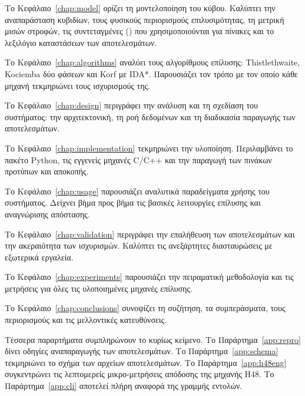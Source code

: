 Το Κεφάλαιο~\ref{chap:model} ορίζει τη μοντελοποίηση του κύβου. Καλύπτει την αναπαράσταση κυβιδίων, τους φυσικούς περιορισμούς επιλυσιμότητας, τη μετρική μισών στροφών, τις συντεταγμένες () που χρησιμοποιούνται για πίνακες και το λεξιλόγιο καταστάσεων των αποτελεσμάτων.

Το Κεφάλαιο~\ref{chap:algorithms} αναλύει τους αλγορίθμους επίλυσης: Thistlethwaite, Kociemba δύο φάσεων και Korf με IDA*. Παρουσιάζει τον τρόπο με τον οποίο κάθε μηχανή τεκμηριώνει τους ισχυρισμούς της.

Το Κεφάλαιο~\ref{chap:design} περιγράφει την ανάλυση και τη σχεδίαση του συστήματος: την αρχιτεκτονική, τη ροή δεδομένων και τη διαδικασία παραγωγής των αποτελεσμάτων.

Το Κεφάλαιο~\ref{chap:implementation} τεκμηριώνει την υλοποίηση. Περιλαμβάνει το πακέτο Python, τις εγγενείς μηχανές C/C++ και την παραγωγή των πινάκων προτύπων και αποκοπής.

Το Κεφάλαιο~\ref{chap:usage} παρουσιάζει αναλυτικά παραδείγματα χρήσης του συστήματος. Δείχνει βήμα προς βήμα τις βασικές λειτουργίες επίλυσης και αναγνώρισης απόστασης.

Το Κεφάλαιο~\ref{chap:validation} περιγράφει την επαλήθευση των αποτελεσμάτων και την ακεραιότητα των ισχυρισμών. Καλύπτει τις ανεξάρτητες διασταυρώσεις με εξωτερικά εργαλεία.

Το Κεφάλαιο~\ref{chap:experiments} παρουσιάζει την πειραματική μεθοδολογία και τις μετρήσεις για όλες τις υλοποιημένες μηχανές επίλυσης.

Το Κεφάλαιο~\ref{chap:conclusions} συνοψίζει τη συζήτηση, τα συμπεράσματα, τους περιορισμούς και τις μελλοντικές κατευθύνσεις.

Τέσσερα παραρτήματα συμπληρώνουν το κυρίως κείμενο. Το Παράρτημα~\ref{app:repro} δίνει οδηγίες αναπαραγωγής των αποτελεσμάτων. Το Παράρτημα~\ref{app:schema} τεκμηριώνει το σχήμα των αρχείων αποτελεσμάτων. Το Παράρτημα~\ref{app:h48eng} συγκεντρώνει τις λεπτομερείς μικρο-μετρήσεις απόδοσης της μηχανής H48. Το Παράρτημα~\ref{app:cli} αποτελεί πλήρη αναφορά της γραμμής εντολών.
